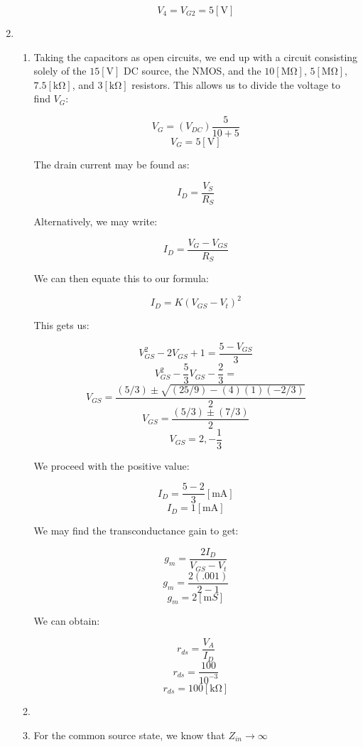 \begin{enumerate}
\begin{enumerate}
        $$\boxed{V_4=V_{G2}=5[\si{\volt}]}$$

    \end{enumerate}

  \item

    \begin{enumerate}

      \item Taking the capacitors as open circuits, we end up with a circuit consisting solely of the $15[\si{\volt}]$ DC source, the NMOS, and the $10[\si{\mega\ohm}]$, $5[\si{\mega\ohm}]$, $7.5[\si{\kilo\ohm}]$, and $3[\si{\kilo\ohm}]$ resistors. This allows us to divide the voltage to find $V_G$:

        $$V_G=(V_{DC})\frac{5}{10+5}$$
        $$\boxed{V_G=5[\si{\volt}]}$$

        The drain current may be found as:

        $$I_D=\frac{V_S}{R_S}$$

        Alternatively, we may write:

        $$I_D=\frac{V_G-V_{GS}}{R_S}$$

        We can then equate this to our formula:

        $$I_D=K(V_{GS}-V_t)^2$$

        This gets us:

        $$V_{GS}^2-2V_{GS}+1=\frac{5-V_{GS}}{3}$$
        $$V_{GS}^2-\frac{5}{3}V_{GS}-\frac{2}{3}=$$
        $$V_{GS}=\frac{(5/3)\pm\sqrt{(25/9)-(4)(1)(-2/3)}}{2}$$
        $$V_{GS}=\frac{(5/3)\pm(7/3)}{2}$$
        $$V_{GS}=2,-\frac{1}{3}$$

        We proceed with the positive value:

        $$I_D=\frac{5-2}{3}[\si{\milli\ampere}]$$
        $$\boxed{I_D=1[\si{\milli\ampere}]}$$

        We may find the transconductance gain to get:

        $$g_m=\frac{2I_D}{V_{GS}-V_t}$$
        $$g_m=\frac{2(.001)}{2-1}$$
        $$\boxed{g_m=2[\si{\milli S}]}$$

        We can obtain:

        $$r_{ds}=\frac{V_A}{I_D}$$
        $$r_{ds}=\frac{100}{10^{-3}}$$
        $$\boxed{r_{ds}=100[\si{\kilo\ohm}]}$$

      \item 

      \item For the common source state, we know that $\boxed{Z_{in}\to\infty}$


\end{enumerate}
\end{enumerate}
